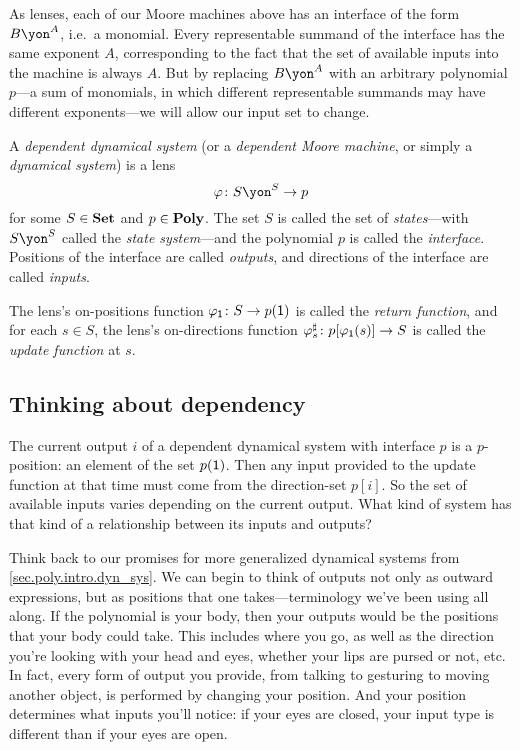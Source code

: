\documentclass[Book-Poly]{subfiles}
\begin{document}
As lenses, each of our Moore machines above has an interface of the form $B\yon^A$, i.e.\ a monomial.
Every representable summand of the interface has the same exponent $A$, corresponding to the fact that the set of available inputs into the machine is always $A$.
But by replacing $B\yon^A$ with an arbitrary polynomial $p$---a sum of monomials, in which different representable summands may have different exponents---we will allow our input set to change.

\begin{definition}\label{def.gen_moore}
A \emph{dependent dynamical system} (or a \emph{dependent Moore machine}, or simply a \emph{dynamical system}) is a lens
\[\varphi\colon S\yon^S\to p\]
for some $S\in\mathbf{Set}$ and $p\in\mathbf{Poly}$. The set $S$ is called the set of \emph{states}---with $S\yon^S$ called the \emph{state system}---and the polynomial $p$ is called the \emph{interface}.
Positions of the interface are called \emph{outputs}, and directions of the interface are called \emph{inputs}.

The lens's on-positions function $\varphi_{\textsf{1}}\colon S\to p(\textsf{1})$ is called the \emph{return function}, and for each $s\in S$, the lens's on-directions function $\varphi^\sharp_s\colon p[\varphi_{\textsf{1}}(s)]\to S$ is called the \emph{update function} at $s$.
\end{definition}

\subsection{Thinking about dependency}

The current output $i$ of a dependent dynamical system with interface $p$ is a $p$-position: an element of the set $p(\textsf{1})$.
Then any input provided to the update function at that time must come from the direction-set $p[i]$.
So the set of available inputs varies depending on the current output.
What kind of system has that kind of a relationship between its inputs and outputs?

Think back to our promises for more generalized dynamical systems from \cref{sec.poly.intro.dyn_sys}.
We can begin to think of outputs not only as outward expressions, but as positions that one takes---terminology we've been using all along.
If the polynomial is your body, then your outputs would be the positions that your body could take.
This includes where you go, as well as the direction you're looking with your head and eyes, whether your lips are pursed or not, etc.
In fact, every form of output you provide, from talking to gesturing to moving another object, is performed by changing your position. And your position determines what inputs you'll notice: if your eyes are closed, your input type is different than if your eyes are open.
\end{document}
